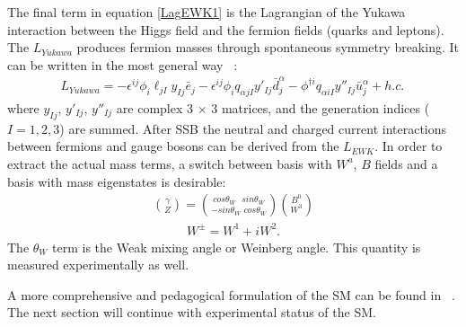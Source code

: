 The final term in equation \ref{LagEWK1}  is the Lagrangian of the Yukawa interaction between the Higgs field and the fermion fields (quarks and leptons). The $L_{Yukawa}$ produces fermion masses through spontaneous symmetry breaking. It can be written in the most general way ~\cite{srednicki}:
\begin{eqnarray}
\label{LagYukawa1}
{L_{Yukawa} = -\epsilon^{ij}\phi_i\ell_{jI}y_{Ij}\bar{e}_j - \epsilon^{ij}\phi_iq_{\alpha jI}y'_{Ij}\bar{d}_{j}^\alpha - \phi^{\dagger i}q_{\alpha iI}y''_{Ij}\bar{u}_{j}^\alpha +h.c.}\,
\end{eqnarray}
where $y_{Ij}$, $y'_{Ij}$, $y''_{Ij}$ are complex $3\,\times\,3$ matrices, and the generation indices ($I=1,2,3$) are summed.
After SSB the neutral and charged current interactions between fermions and gauge bosons can be derived from the $L_{EWK}$.  In order to extract the actual mass terms, a switch between basis with $W^a$, $B$ fields and a basis with mass eigenstates is desirable:
\begin{eqnarray}
\label{Zbos}
	{ \gamma \choose Z } = { cos \theta_W \, \,\, \, sin \theta_W \choose -sin \theta_W \,\, cos \theta_W  } { B^0 \choose W^3 }
\end{eqnarray}
\begin{eqnarray}
\label{Wbos}
	{W^{\pm}}= {W^1+iW^2} .
\end{eqnarray}
The $\theta_W $ term is the Weak mixing angle or Weinberg angle. This quantity is measured experimentally as well.

A more comprehensive and pedagogical formulation of the SM can be found in ~\cite{srednicki,Olive:2016xmw}. The next section will continue with experimental status of the SM.

